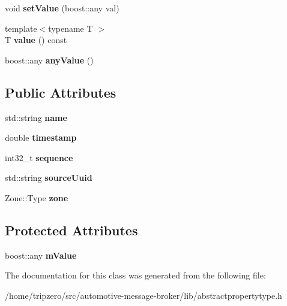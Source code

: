 \begin{DoxyCompactItemize}
\item 
\hypertarget{classAbstractPropertyType_ab0de214290dde344d367c7281d293020}{void {\bfseries set\-Value} (boost\-::any val)}\label{classAbstractPropertyType_ab0de214290dde344d367c7281d293020}

\item 
\hypertarget{classAbstractPropertyType_ae723621925382263eba046fa1ca8e36d}{{\footnotesize template$<$typename T $>$ }\\T {\bfseries value} () const }\label{classAbstractPropertyType_ae723621925382263eba046fa1ca8e36d}

\item 
\hypertarget{classAbstractPropertyType_a7ba4118acb746d2b8fc220a12b0e2666}{boost\-::any {\bfseries any\-Value} ()}\label{classAbstractPropertyType_a7ba4118acb746d2b8fc220a12b0e2666}

\end{DoxyCompactItemize}
\subsection*{Public Attributes}
\begin{DoxyCompactItemize}
\item 
\hypertarget{classAbstractPropertyType_a0899de35293963a6c18a0f4913916871}{std\-::string {\bfseries name}}\label{classAbstractPropertyType_a0899de35293963a6c18a0f4913916871}

\item 
\hypertarget{classAbstractPropertyType_a6a391546600fde38a351d3d236be8a9b}{double {\bfseries timestamp}}\label{classAbstractPropertyType_a6a391546600fde38a351d3d236be8a9b}

\item 
\hypertarget{classAbstractPropertyType_ae74440c78c4a5f6af1c3b9c85f1a34c2}{int32\-\_\-t {\bfseries sequence}}\label{classAbstractPropertyType_ae74440c78c4a5f6af1c3b9c85f1a34c2}

\item 
\hypertarget{classAbstractPropertyType_abe2de53722d28e8e7c2a715b97e1ae48}{std\-::string {\bfseries source\-Uuid}}\label{classAbstractPropertyType_abe2de53722d28e8e7c2a715b97e1ae48}

\item 
\hypertarget{classAbstractPropertyType_a420b96a1fcbcbe513ff3801185e788bc}{Zone\-::\-Type {\bfseries zone}}\label{classAbstractPropertyType_a420b96a1fcbcbe513ff3801185e788bc}

\end{DoxyCompactItemize}
\subsection*{Protected Attributes}
\begin{DoxyCompactItemize}
\item 
\hypertarget{classAbstractPropertyType_a69b5d8cd643415d4f63cd6a9e19721d9}{boost\-::any {\bfseries m\-Value}}\label{classAbstractPropertyType_a69b5d8cd643415d4f63cd6a9e19721d9}

\end{DoxyCompactItemize}


The documentation for this class was generated from the following file\-:\begin{DoxyCompactItemize}
\item 
/home/tripzero/src/automotive-\/message-\/broker/lib/abstractpropertytype.\-h\end{DoxyCompactItemize}

